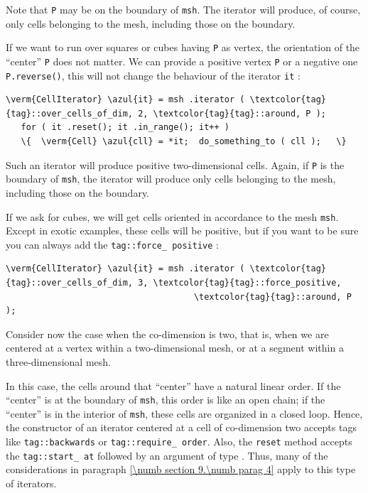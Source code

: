 Note that {\small\tt P} may be on the boundary of {\small\tt msh}.
The iterator will produce, of course, only cells belonging to the mesh, including those
on the boundary.

If we want to run over squares or cubes having {\small\tt P} as vertex,
the orientation of the ``center'' {\small\tt P} does not matter.
We can provide a positive vertex {\small\tt P} or a negative one {\small\tt P.reverse()},
this will not change the behaviour of the iterator {\small\tt it} :

\begin{Verbatim}[commandchars=\\\{\},formatcom=\small\tt,
   baselinestretch=0.94,framesep=2mm                      ]
   \verm{CellIterator} \azul{it} = msh .iterator ( \textcolor{tag}{tag}::over_cells_of_dim, 2, \textcolor{tag}{tag}::around, P );
   for ( it .reset(); it .in_range(); it++ )
   \{  \verm{Cell} \azul{cll} = *it;  do_something_to ( cll );   \}
\end{Verbatim}

Such an iterator will produce positive two-dimensional cells.
Again, if {\small\tt P} is the boundary of {\small\tt msh}, the iterator will produce
only cells belonging to the mesh, including those on the boundary.

If we ask for cubes, we will get cells oriented in accordance to the mesh {\small\tt msh}.
Except in exotic examples, these cells will be positive, but if you want to be sure you
can always add the {\small\tt\textcolor{tag}{tag}::force\_\,positive} :

\begin{Verbatim}[commandchars=\\\{\},formatcom=\small\tt,
   baselinestretch=0.94,framesep=2mm                      ]
   \verm{CellIterator} \azul{it} = msh .iterator ( \textcolor{tag}{tag}::over_cells_of_dim, 3, \textcolor{tag}{tag}::force_positive,
                                     \textcolor{tag}{tag}::around, P                                 );
\end{Verbatim}

Consider now the case when the co-dimension is two, that is, when we are centered at a vertex
within a two-dimensional mesh, or at a segment within a three-dimensional mesh.

In this case, the cells around that ``center'' have a natural linear order.
If the ``center'' is at the boundary of {\small\tt msh}, this order is like an
open chain; if the ``center'' is in the interior of {\small\tt msh}, these cells
are organized in a closed loop.
Hence, the constructor of an iterator centered at a cell of co-dimension two accepts
tags like {\small\tt\textcolor{tag}{tag}::backwards} or {\small\tt\textcolor{tag}{tag}::require\_\,order}.
Also, the {\small\tt reset} method accepts the {\small\tt\textcolor{tag}{tag}::start\_\,at} followed
by an argument of type {\small\tt{}}.
Thus, many of the considerations in paragraph \ref{\numb section 9.\numb parag 4}
apply to this type of iterators.

